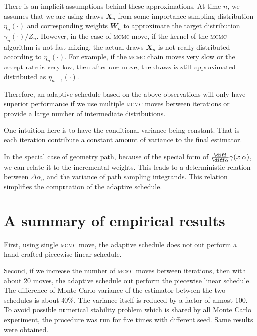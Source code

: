 \documentclass[11pt, fontset = Minion]{marticle}
\def\mcmc{\textsc{mcmc}\xspace}
\def\W{\mathbfit{W}}
\def\X{\mathbfit{X}}
\begin{document}
  \begin{remark}
    There is an implicit assumptions behind these approximations. At time $n$,
    we assumes that we are using draws $\X_n$ from some importance sampling
    distribution $\eta_n(\cdot)$ and corresponding weights $\W_n$ to
    approximate the target distribution $\gamma_n(\cdot)/Z_n$. However, in the
    case of \mcmc move, if the kernel of the \mcmc algorithm is not fast
    mixing, the actual draws $\X_n$ is not really distributed according to
    $\eta_n(\cdot)$. For example, if the \mcmc chain moves very slow or the
    accept rate is very low, then after one move, the draws is still
    approximated distributed as $\eta_{n-1}(\cdot)$.

    Therefore, an adaptive schedule based on the above observations will only
    have superior performance if we use multiple \mcmc moves between
    iterations or provide a large number of intermediate distributions.
  \end{remark}

  \begin{remark}
    One intuition here is to have the conditional variance being constant.
    That is each iteration contribute a constant amount of variance to the
    final estimator.

    In the special case of geometry path, because of the special form of
    $\frac{\diff}{\diff\alpha}\gamma(x|\alpha)$, we can relate it to the
    incremental weights. This leads to a deterministic relation between
    $\Delta\alpha_n$ and the variance of path sampling integrands. This
    relation simplifies the computation of the adaptive schedule.
  \end{remark}

  \section{A summary of empirical results}

  First, using single \mcmc move, the adaptive schedule does not out perform
  a hand crafted piecewise linear schedule.

  Second, if we increase the number of \mcmc moves between iterations, then
  with about 20 moves, the adaptive schedule out perform the piecewise linear
  schedule. The difference of Monte Carlo variance of the estimator between
  the two schedules is about 40\%. The variance itself is reduced by a factor
  of almost 100. To avoid possible numerical stability problem which is shared
  by all Monte Carlo experiment, the procedure was run for five times with
  different seed. Same results were obtained.
\end{document}
